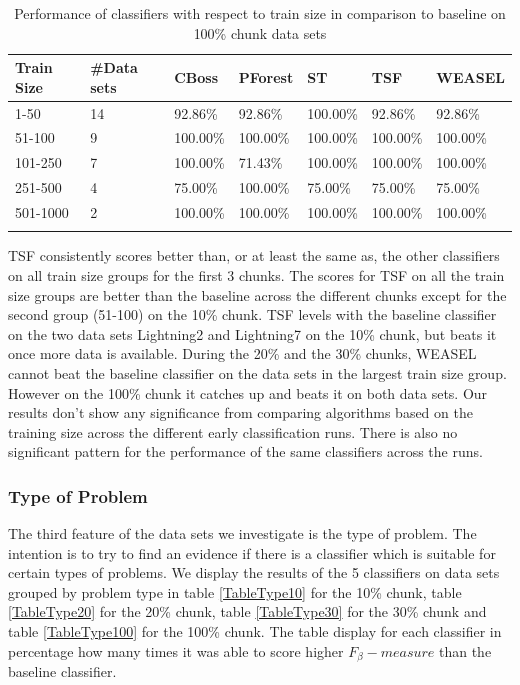 \begin{table}[hbt!]
	\setlength\extrarowheight{2pt} %
	\begin{tabularx}{\textwidth}{|X|X|X|X|X|X|X|}
	\hline
	\textbf{Train Size} & \textbf{\#Data sets} & \textbf{CBoss} & \textbf{PForest} & \textbf{ST} & \textbf{TSF} & \textbf{WEASEL} \\ \hline
		1-50 & 14 & 92.86\% & 92.86\% & 100.00\% & 92.86\% & 92.86\% \\ \hline
		51-100 & 9 & 100.00\% & 100.00\% & 100.00\% & 100.00\% & 100.00\% \\ \hline
		101-250 & 7 & 100.00\% & 71.43\% & 100.00\% & 100.00\% & 100.00\% \\ \hline
		251-500 & 4 & 75.00\% & 100.00\% & 75.00\% & 75.00\% & 75.00\% \\ \hline
		501-1000 & 2 &100.00\% & 100.00\% & 100.00\% & 100.00\% & 100.00\% \\ \hline
  \caption{Performance of classifiers with respect to train size in comparison to baseline on 100\% chunk data sets}
  \label{TableSize100}
  \end{tabularx}
\end{table}

TSF consistently scores better than, or at least the same as, the other classifiers on all train size groups for the first 3 chunks.
The scores for TSF on all the train size groups are better than the baseline across the different chunks except for the second group (51-100) on the 10\% chunk.
TSF levels with the baseline classifier on the two data sets Lightning2 and Lightning7 on the 10\% chunk, but beats it once more data is available.
During the 20\% and the 30\% chunks, WEASEL cannot beat the baseline classifier on the data sets in the largest train size group.
However on the 100\% chunk it catches up and beats it on both data sets.
Our results don't show any significance from comparing algorithms based on the training size across the different early classification runs.
There is also no significant pattern for the performance of the same classifiers across the runs.


\subsubsection{Type of Problem}
The third feature of the data sets we investigate is the type of problem.
The intention is to try to find an evidence if there is a classifier which is suitable for certain types of problems.
We display the results of the 5 classifiers on data sets grouped by problem type in table \ref{TableType10} for the 10\% chunk, table \ref{TableType20} for the 20\% chunk, table \ref{TableType30} for the 30\% chunk and table \ref{TableType100} for the 100\% chunk.
The table display for each classifier in percentage how many times it was able to score higher $F_{\beta}-measure$ than the baseline classifier.

